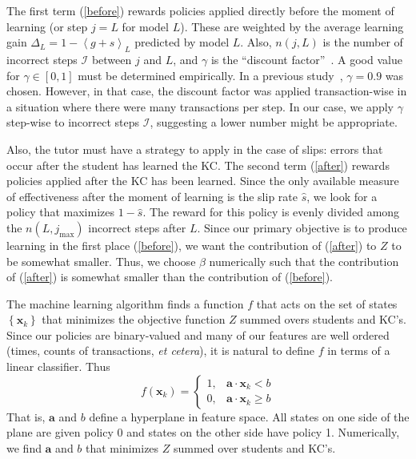 \documentclass[11pt,letterpaper]{article}
\begin{document}
The first term (\ref{before}) rewards policies applied directly before
the moment of learning (or step $j=L$ for model $L$).  
These are weighted by the 
average learning gain $\Delta_L = 1-\left\langle g+s\right\rangle_L$ 
predicted by model $L$.
Also, $n(j,L)$ is the number
of incorrect steps $\mathcal{I}$ between $j$ and $L$, 
and $\gamma$ is the ``discount factor''~\cite{ml}. 
A good value for $\gamma \in [0,1]$ must be determined empirically.
In a previous study~\cite{mint}, $\gamma=0.9$ was chosen.
However, in that case, the discount factor was applied transaction-wise in 
a situation where there were many transactions per step.  In our case, 
we apply $\gamma$ step-wise to incorrect steps $\mathcal{I}$, 
suggesting a lower number might be appropriate.

Also, the tutor must have a strategy to apply in the case of slips: 
errors that occur after the student has learned the KC.
The second term (\ref{after}) rewards policies applied after
the KC has been learned.  Since the only available measure of 
effectiveness after the moment of learning is the slip rate $\hat{s}$, 
we look for a policy that maximizes $1-\hat{s}$.  The reward for 
this policy is evenly divided among the $n(L,j_\mathrm{max})$ 
incorrect steps after $L$.
Since our primary objective is to produce learning in the first
place (\ref{before}), we want the contribution of (\ref{after})
to $Z$ to be somewhat smaller.  Thus, we choose $\beta$ numerically 
such that the contribution of (\ref{after}) is somewhat smaller than 
the contribution of (\ref{before}).

The machine learning algorithm finds a function $f$ that acts on
the set of states $\left\{\mathbf{x}_k\right\}$ that minimizes
the objective function $Z$ summed overs students and KC's.  
Since our policies are binary-valued
and many of our features are well ordered (times, counts of transactions,
{\em et cetera}), it is natural to define $f$ in terms of a 
linear classifier.  Thus
%
\begin{equation}
              f(\mathbf{x}_k) = \left\{\begin{array}{cc}
		1,& \mathbf{a}\cdot \mathbf{x}_k <b \\
                0, & \mathbf{a}\cdot \mathbf{x}_k \ge b
		\end{array} \right.
\end{equation}
%
That is, $\mathbf{a}$ and $b$ define a hyperplane in feature
space.  All states on one side of the plane are given policy 0
and states on the other side have policy 1.
Numerically, we find $\mathbf{a}$ and $b$ that minimizes $Z$
summed over students and KC's.
\end{document}
